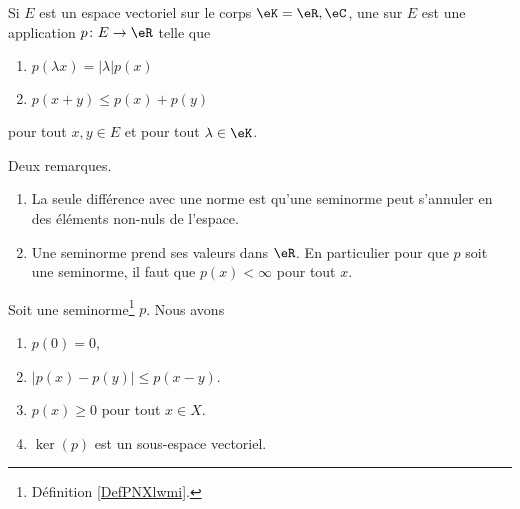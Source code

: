 \begin{definition}  \label{DefPNXlwmi}
	Si \( E\) est un espace vectoriel sur le corps \( \eK=\eR,\eC\), une  sur \( E\) est une application \( p\colon E\to \eR\) telle que
	\begin{enumerate}
		\item   \label{ItemSHnimhDii}
		      \( p(\lambda x)=| \lambda |p(x)\)
		\item   \label{ItemSHnimhDiii}
		      \( p(x+y)\leq p(x)+p(y)\)
	\end{enumerate}
	pour tout \( x,y\in E\) et pour tout \( \lambda\in \eK\).
\end{definition}

\begin{remark}
	Deux remarques.
	\begin{enumerate}
		\item
		      La seule différence avec une norme est qu'une seminorme peut s'annuler en des éléments non-nuls de l'espace.
		\item
		      Une seminorme prend ses valeurs dans \( \eR\). En particulier pour que \( p\) soit une seminorme, il faut que \( p(x)<\infty\) pour tout \( x\).
	\end{enumerate}
\end{remark}

\begin{lemma}		\label{LEMooHTOAooGmRGZL}
	Soit une seminorme\footnote{Définition \ref{DefPNXlwmi}.} \( p\). Nous avons
	\begin{enumerate}
		\item		\label{ITEMooFRCRooZBWTxH}
		      \( p(0)=0\),
		\item		\label{ITEMooHVWHooAVZsTf}
		      \( | p(x)-p(y) |\leq p(x-y)\).
		\item		\label{ITEMooXCHBooDoBvpL}
		      \( p(x)\geq 0\) pour tout \( x\in X\).
		\item	\label{ITEMooQIGMooVNDakF}
		      \( \ker(p)\) est un sous-espace vectoriel.
	\end{enumerate}
\end{lemma}

